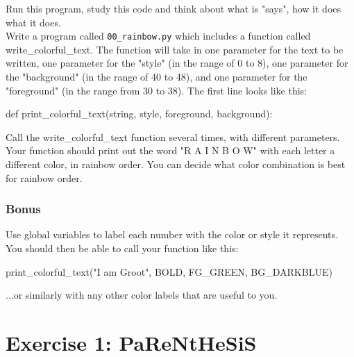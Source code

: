 \documentclass{42-en}
\begin{document}
Run this program, study this code and think about what is "says", how it does what it does.\\

Write a program called \texttt{00\_rainbow.py} which includes a function called write\_colorful\_text. The function will take in one parameter for the text to be written, one parameter for the "style" (in the range of 0 to 8), one parameter for the "background" (in the range of 40 to 48), and one parameter for the "foreground" (in the range from 30 to 38). The first line looks like this:

\begin{42pycode}
def print_colorful_text(string, style, foreground, background):
\end{42pycode}

Call the write\_colorful\_text function several times, with different parameters. Your function should print out the word "R A I N B O W" with each letter a different color, in rainbow order. You can decide what color combination is best for rainbow order.\\

\subsection{Bonus}

Use global variables to label each number with the color or style it represents. You should then be able to call your function like this:
\begin{42pycode}
print_colorful_text("I am Groot", BOLD, FG_GREEN, BG_DARKBLUE)
\end{42pycode}

...or similarly with any other color labels that are useful to you.


\nextexercice
\newpage


\chapter{Exercise 1: PaReNtHeSiS}
\makeheaderfiles
\end{document}
